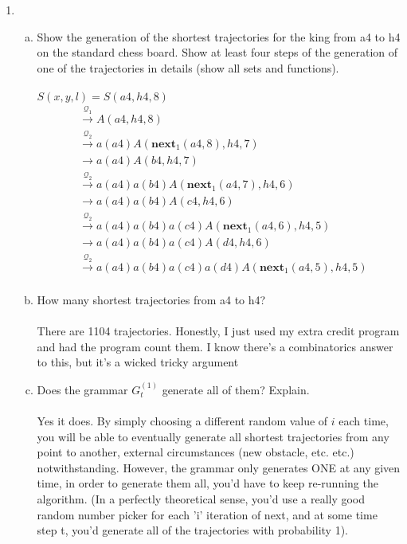 \documentclass[11pt]{article}
\begin{document}
\begin{enumerate}
\item 
\begin{enumerate}[(a)]
\item Show the generation of the shortest trajectories for the king from a4 to h4 on the standard chess board. Show at least four steps of the generation of one of the trajectories in details (show all sets and functions). \\\\
$S(x,y,l) = S(a4, h4, 8)$
\begin{align*}
&\overset{\mathcal{Q}_1}{\rightarrow} A(a4, h4, 8)\\
&\overset{\mathcal{Q}_2}{\rightarrow} a(a4)A(\textbf{next}_1 (a4, 8), h4, 7)\\
&\rightarrow a(a4)A(b4, h4, 7)\\
&\overset{\mathcal{Q}_2}{\rightarrow} a(a4)a(b4)A(\textbf{next}_1 (a4, 7), h4, 6)\\
&\rightarrow a(a4)a(b4)A(c4, h4, 6)\\
&\overset{\mathcal{Q}_2}{\rightarrow} a(a4)a(b4)a(c4)A(\textbf{next}_1 (a4, 6), h4, 5)\\
&\rightarrow a(a4)a(b4)a(c4)A(d4, h4, 6)\\
&\overset{\mathcal{Q}_2}{\rightarrow}a(a4)a(b4)a(c4)a(d4)A(\textbf{next}_1 (a4, 5), h4, 5)\\
\end{align*}
\item How many shortest trajectories from a4 to h4? \\\\
There are 1104 trajectories. Honestly, I just used my extra credit program and had the program count them. I know there's a combinatorics answer to this, but it's a wicked tricky argument 
\item Does the grammar $G_t^(1)$ generate all of them? Explain. \\\\
Yes it does. By simply choosing a different random value of $i$ each time, you will be able to eventually generate all shortest trajectories from any point to another, external circumstances (new obstacle, etc. etc.) notwithstanding. However, the grammar only generates ONE at any given time, in order to generate them all, you'd have to keep re-running the algorithm. (In a perfectly theoretical sense, you'd use a really good random number picker for each 'i' iteration of next, and at some time step t, you'd generate all of the trajectories with probability 1). 

\end{enumerate}
\end{enumerate}
\end{document}

